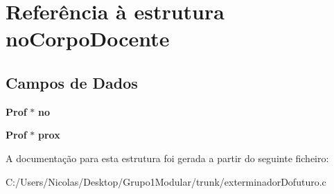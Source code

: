 \section{Referência à estrutura no\+Corpo\+Docente}
\label{structno_corpo_docente}
\subsection*{Campos de Dados}
\begin{DoxyCompactItemize}
\item 
\mbox{\label{structno_corpo_docente_a281948df0458ddaf1f5c96a8658da541}} 
\textbf{ Prof} $\ast$ {\bfseries no}
\item 
\mbox{\label{structno_corpo_docente_ae16fe9d37416aef828187b228d1a9589}} 
\textbf{ Prof} $\ast$ {\bfseries prox}
\end{DoxyCompactItemize}


A documentação para esta estrutura foi gerada a partir do seguinte ficheiro\+:\begin{DoxyCompactItemize}
\item 
C\+:/\+Users/\+Nicolas/\+Desktop/\+Grupo1\+Modular/trunk/exterminador\+Dofuturo.\+c\end{DoxyCompactItemize}
